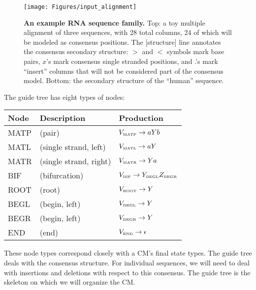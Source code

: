 \documentclass[11pt]{article}
\begin{document}
\begin{figure}[t]
\begin{center}
\texttt{[image: Figures/input\_alignment]}
\end{center}
\caption{\textbf{An example RNA sequence family.} Top: a toy multiple
alignment of three sequences, with 28 total columns, 24 of which will
be modeled as consensus positions. The [structure] line annotates the
consensus secondary structure: $>$ and $<$ symbols mark base pairs,
$x$'s mark consensus single stranded positions, and .'s mark
``insert'' columns that will not be considered part of the consensus
model. Bottom: the secondary structure of the ``human'' sequence.} 
\label{fig:input_alignment}
\end{figure}

The guide tree has eight types of nodes:

\vspace{0.5em}
\begin{tabular}{lll}
Node      & Description      &  Production           \\ \hline
MATP  & (pair)                 & $V_{\mbox{\tiny MATP}} \rightarrow a Y b$  \\
MATL  & (single strand, left)  & $V_{\mbox{\tiny MATL}} \rightarrow a Y$   \\
MATR  & (single strand, right) & $V_{\mbox{\tiny MATR}} \rightarrow Y a$   \\
BIF   & (bifurcation)          & $V_{\mbox{\tiny BIF}}  \rightarrow
Y_{\mbox{\tiny BEGL}} Z_{\mbox{\tiny BEGR}}$ \\
ROOT  & (root)                 & $V_{\mbox{\tiny ROOT}} \rightarrow Y$       \\
BEGL  & (begin, left)          & $V_{\mbox{\tiny BEGL}} \rightarrow Y$       \\
BEGR  & (begin, left)          & $V_{\mbox{\tiny BEGR}} \rightarrow Y$       \\
END   & (end)                  & $V_{\mbox{\tiny END}}  \rightarrow \epsilon$ \\ \hline
\end{tabular}
\vspace{0.5em}
 
These node types correspond closely with a CM's final state types.
The guide tree deals with the consensus structure. For individual
sequences, we will need to deal with insertions and deletions with
respect to this consensus. The guide tree is the skeleton on which we
will organize the CM.
\end{document}
